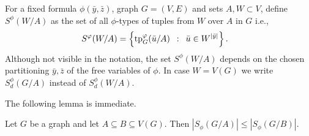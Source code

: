 For a fixed formula $\phi(\bar y,\bar z)$,  graph $G=(V,E)$ and sets $A,W\subset V$, define
 $S^\phi(W/A)$ as the set of all $\phi$-types of tuples from $W$ over $A$ in $G$
i.e., \begin{align*}
S^\varphi(W/A)&=\left\{\mathrm{tp}^\varphi_G(\bar u/A) \,~:~\, \bar u\in W^{|\bar y|} \right\}.
\end{align*}
Although not visible in the notation, the set $S^\phi(W/A)$ depends on the chosen partitioning $\bar y,\bar z$ of the free variables of $\phi$.
In case $W=V(G)$ we write $S^{\phi}_d(G/A)$ instead of 
$S^{\phi}_d(W/A)$.

The following lemma is immediate.
\begin{lemma}\label{lem:types-over-B}
Let $G$ be a graph and let $A\subseteq B\subseteq V(G)$. Then 
$|S_\phi(G/A)|\leq |S_\phi(G/B)|$. 
\end{lemma}





